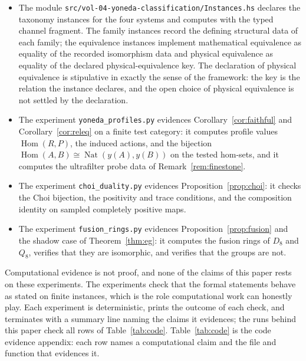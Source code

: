 \documentclass[11pt,letterpaper]{article}
\DeclareMathOperator{\Hom}{Hom}
\DeclareMathOperator{\Nat}{Nat}
\theoremstyle{definition}
\theoremstyle{remark}
\begin{document}
\begin{itemize}
\item The module \texttt{src/vol-04-yoneda-classification/Instances.hs} declares the taxonomy instances for the four systems and computes with the typed channel fragment. The family instances record the defining structural data of each family; the equivalence instances implement mathematical equivalence as equality of the recorded isomorphism data and physical equivalence as equality of the declared physical-equivalence key. The declaration of physical equivalence is stipulative in exactly the sense of the framework: the key is the relation the instance declares, and the open choice of physical equivalence is not settled by the declaration.
\item The experiment \texttt{yoneda\_profiles.py} evidences Corollary~\ref{cor:faithful} and Corollary~\ref{cor:releq} on a finite test category: it computes profile values $\Hom(R, P)$, the induced actions, and the bijection $\Hom(A, B) \cong \Nat(y(A), y(B))$ on the tested hom-sets, and it computes the ultrafilter probe data of Remark~\ref{rem:finestone}.
\item The experiment \texttt{choi\_duality.py} evidences Proposition~\ref{prop:choi}: it checks the Choi bijection, the positivity and trace conditions, and the composition identity on sampled completely positive maps.
\item The experiment \texttt{fusion\_rings.py} evidences Proposition~\ref{prop:fusion} and the shadow case of Theorem~\ref{thm:eg}: it computes the fusion rings of $D_8$ and $Q_8$, verifies that they are isomorphic, and verifies that the groups are not.
\end{itemize}

Computational evidence is not proof, and none of the claims of this paper rests on these experiments. The experiments check that the formal statements behave as stated on finite instances, which is the role computational work can honestly play. Each experiment is deterministic, prints the outcome of each check, and terminates with a summary line naming the claims it evidences; the runs behind this paper check all rows of Table~\ref{tab:code}. Table~\ref{tab:code} is the code evidence appendix: each row names a computational claim and the file and function that evidences it.
\end{document}

